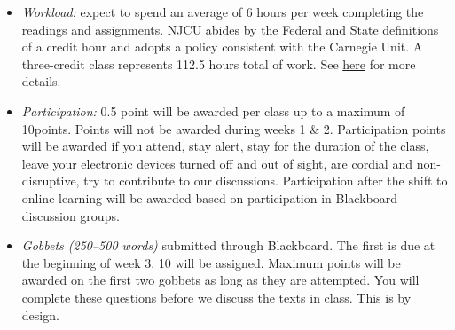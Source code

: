 \documentclass[article,oneside]{memoir}
\begin{document}
\begin{itemize}



\item \textit{Workload:} expect to spend an average of 6 hours per week completing the readings and assignments. NJCU abides by the Federal and State definitions of a credit hour and adopts a policy consistent with the Carnegie Unit. A three-credit class represents 112.5 hours total of work. See \href{http://scottoconnor.org/resources/Credit.pdf}{here} for more details.

\item \textit{Participation:} 0.5 point will be awarded per class up to a maximum of 10points. Points will not be awarded during weeks 1 \& 2. Participation points will be awarded if you attend, stay alert, stay for the duration of the class, leave your electronic devices turned off and out of sight, are cordial and non-disruptive, try to contribute to our discussions. Participation after the shift to online learning will be awarded based on participation in Blackboard discussion groups.


\item \textit{Gobbets (250--500 words)} submitted through Blackboard. The first is due at the beginning of week 3. 10 will be assigned. Maximum points will be awarded on the first two gobbets as long as they are attempted. You will complete these questions before we discuss the texts in class. This is by design. 


\end{itemize}
\end{document}
